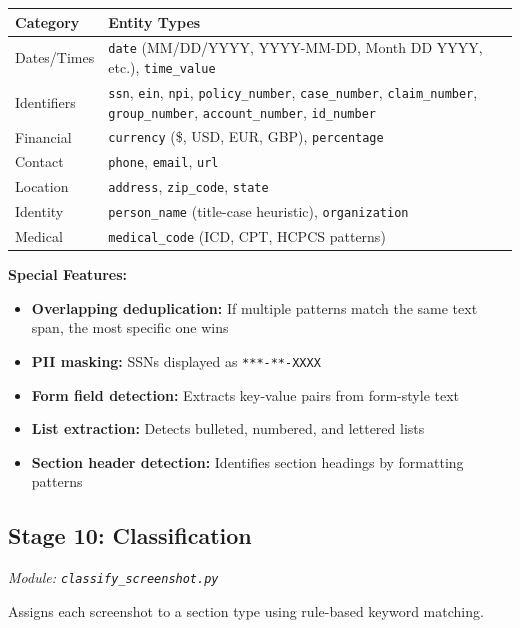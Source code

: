 \documentclass[12pt, a4paper]{article}
\newcommand{\codeinline}[1]{\texttt{\small\colorbox{codebg}{#1}}}
\newcommand{\filepath}[1]{\texttt{\small #1}}
\begin{document}
\begin{longtable}{@{} l p{10cm} @{}}
    \toprule
    \textbf{Category} & \textbf{Entity Types} \\
    \midrule
    \endhead
    Dates/Times & \codeinline{date} (MM/DD/YYYY, YYYY-MM-DD, Month DD YYYY, etc.), \codeinline{time\_value} \\
    Identifiers & \codeinline{ssn}, \codeinline{ein}, \codeinline{npi}, \codeinline{policy\_number}, \codeinline{case\_number}, \codeinline{claim\_number}, \codeinline{group\_number}, \codeinline{account\_number}, \codeinline{id\_number} \\
    Financial & \codeinline{currency} (\$, USD, EUR, GBP), \codeinline{percentage} \\
    Contact & \codeinline{phone}, \codeinline{email}, \codeinline{url} \\
    Location & \codeinline{address}, \codeinline{zip\_code}, \codeinline{state} \\
    Identity & \codeinline{person\_name} (title-case heuristic), \codeinline{organization} \\
    Medical & \codeinline{medical\_code} (ICD, CPT, HCPCS patterns) \\
    \bottomrule
\end{longtable}

\textbf{Special Features:}
\begin{itemize}
    \item \textbf{Overlapping deduplication:} If multiple patterns match the same text span, the most specific one wins
    \item \textbf{PII masking:} SSNs displayed as \codeinline{***-**-XXXX}
    \item \textbf{Form field detection:} Extracts key-value pairs from form-style text
    \item \textbf{List extraction:} Detects bulleted, numbered, and lettered lists
    \item \textbf{Section header detection:} Identifies section headings by formatting patterns
\end{itemize}

\subsection{Stage 10: Classification}
\textit{Module: \filepath{classify\_screenshot.py}}

Assigns each screenshot to a section type using rule-based keyword matching.
\end{document}
